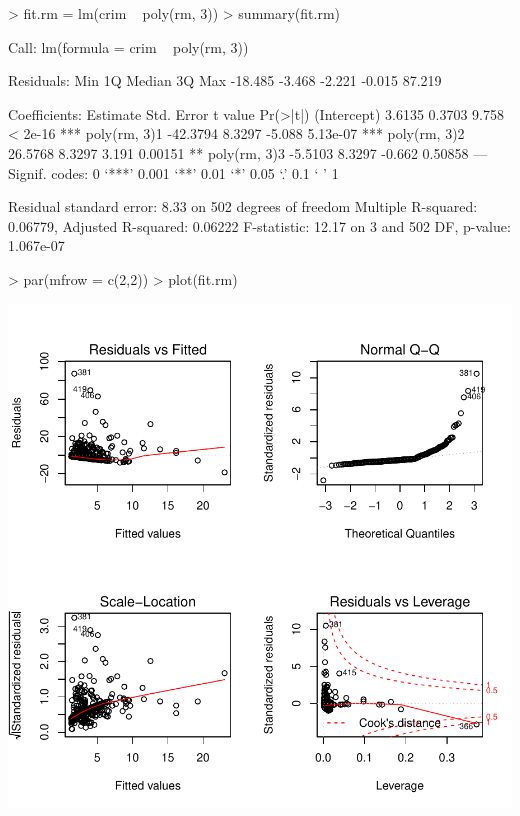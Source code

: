 \documentclass[a4paper]{article}
\begin{document}
\begin{Schunk}
\begin{Sinput}
> fit.rm = lm(crim ~ poly(rm, 3))
> summary(fit.rm)
\end{Sinput}
\begin{Soutput}
Call:
lm(formula = crim ~ poly(rm, 3))

Residuals:
    Min      1Q  Median      3Q     Max 
-18.485  -3.468  -2.221  -0.015  87.219 

Coefficients:
             Estimate Std. Error t value Pr(>|t|)    
(Intercept)    3.6135     0.3703   9.758  < 2e-16 ***
poly(rm, 3)1 -42.3794     8.3297  -5.088 5.13e-07 ***
poly(rm, 3)2  26.5768     8.3297   3.191  0.00151 ** 
poly(rm, 3)3  -5.5103     8.3297  -0.662  0.50858    
---
Signif. codes:  0 ‘***’ 0.001 ‘**’ 0.01 ‘*’ 0.05 ‘.’ 0.1 ‘ ’ 1

Residual standard error: 8.33 on 502 degrees of freedom
Multiple R-squared:  0.06779,	Adjusted R-squared:  0.06222 
F-statistic: 12.17 on 3 and 502 DF,  p-value: 1.067e-07
\end{Soutput}
\begin{Sinput}
> par(mfrow = c(2,2))
> plot(fit.rm)
\end{Sinput}
\end{Schunk}
\includegraphics{mutivariblelm-rm2}
\end{document}
